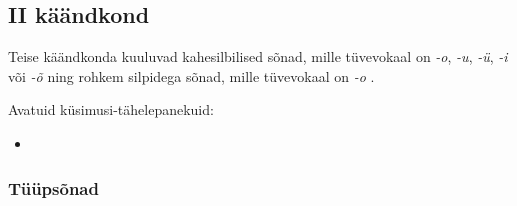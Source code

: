 \documentclass[12pt,a4paper]{article}
\newcommand{\vadja}[1]{\textit{#1}}
\begin{document}
\subsection{\RN{2} käändkond}

Teise käändkonda kuuluvad kahesilbilised sõnad, mille tüvevokaal on \vadja{-o}, \vadja{-u}, \vadja{-ü}, \vadja{-i} või \vadja{-õ} ning rohkem silpidega sõnad, mille tüvevokaal on \vadja{-o} \cite[42]{ariste_grammar_1968}.

Avatuid küsimusi-tähelepanekuid:
\begin{itemize}
\item 
\end{itemize}

\subsubsection*{Tüüpsõnad}
\end{document}
